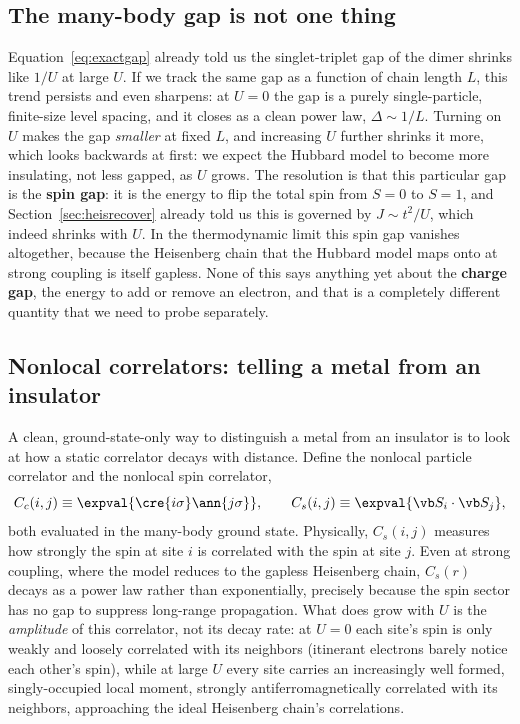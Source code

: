 \documentclass[all_sessions.tex]{subfiles}
\begin{document}
\subsection{The many-body gap is not one thing}
Equation~\eqref{eq:exactgap} already told us the singlet-triplet gap of the dimer shrinks like
$1/U$ at large $U$. If we track the same gap as a function of chain length $L$, this trend persists
and even sharpens: at $U=0$ the gap is a purely single-particle, finite-size level spacing, and it
closes as a clean power law, $\Delta \sim 1/L$. Turning on $U$ makes the gap \emph{smaller} at fixed
$L$, and increasing $U$ further shrinks it more, which looks backwards at first: we expect the
Hubbard model to become more insulating, not less gapped, as $U$ grows. The resolution is that this
particular gap is the \textbf{spin gap}: it is the energy to flip the total spin from $S=0$ to
$S=1$, and Section~\ref{sec:heisrecover} already told us this is governed by $J\sim t^2/U$, which
indeed shrinks with $U$. In the thermodynamic limit this spin gap vanishes altogether, because the
Heisenberg chain that the Hubbard model maps onto at strong coupling is itself gapless. None of this
says anything yet about the \textbf{charge gap}, the energy to add or remove an electron, and that
is a completely different quantity that we need to probe separately.

\subsection{Nonlocal correlators: telling a metal from an insulator}
A clean, ground-state-only way to distinguish a metal from an insulator is to look at how a static
correlator decays with distance. Define the nonlocal particle correlator and the nonlocal spin
correlator,
\begin{equation}
  C_c(i,j) \equiv \expval{\cre{i\sigma}\ann{j\sigma}}, \qquad
  C_s(i,j) \equiv \expval{\vb S_i \cdot \vb S_j},
  \label{eq:corrdefs}
\end{equation}
both evaluated in the many-body ground state. Physically, $C_s(i,j)$ measures how strongly the spin
at site $i$ is correlated with the spin at site $j$. Even at strong coupling, where the model
reduces to the gapless Heisenberg chain, $C_s(r)$ decays as a power law rather than exponentially,
precisely because the spin sector has no gap to suppress long-range propagation. What does grow
with $U$ is the \emph{amplitude} of this correlator, not its decay rate: at $U=0$ each site's spin
is only weakly and loosely correlated with its neighbors (itinerant electrons barely notice each
other's spin), while at large $U$ every site carries an increasingly well formed, singly-occupied
local moment, strongly antiferromagnetically correlated with its neighbors, approaching the ideal
Heisenberg chain's correlations.
\end{document}

